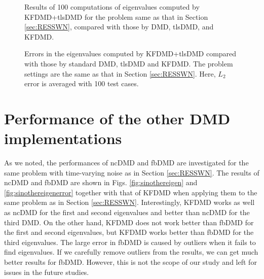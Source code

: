 \documentclass[aip,graphicx]{revtex4-1}
\begin{document}
\begin{figure}
    \caption{Results of 100 computations of eigenvalues computed by KFDMD+tlsDMD for the problem same as that in Section \ref{sec:RESSWN}, compared with those by DMD, tlsDMD, and KFDMD.}	
	\label{fig:sinkfteigen}
\end{figure}
\begin{figure}
   \caption{Errors in the eigenvalues computed by KFDMD+tlsDMD compared with those by standard DMD, tlsDMD and KFDMD. The problem settings are the same as that in Section \ref{sec:RESSWN}. Here, $L_2$ error is averaged with 100 test cases.}	
   \label{fig:sinkfteigenerror}
\end{figure}


\section{Performance of the other DMD implementations}
As we noted, the performances of ncDMD and fbDMD are investigated for the same problem with time-varying noise as in Section \ref{sec:RESSWN}.
The results of ncDMD and fbDMD are shown in Figs. \ref{fig:sinothereigen} and \ref{fig:sinothereigenerror} together with that of KFDMD when applying them to the same problem as in Section \ref{sec:RESSWN}. Interestingly, KFDMD works as well as ncDMD for the first and second eigenvalues and better than ncDMD for the third DMD. On the other hand, KFDMD does not work better than fbDMD for the first and second eigenvalues, but KFDMD works better than fbDMD for the third eigenvalues. The large error in fbDMD is caused by outliers when it fails to find eigenvalues. If we carefully remove outliers from the results, we can get much better results for fbDMD. However, this is not the scope of our study and left for issues in the future studies.
\end{document}
